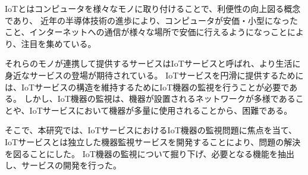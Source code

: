 IoTとはコンピュータを様々なモノに取り付けることで、利便性の向上図る概念であり、
近年の半導体技術の進歩により、コンピュータが安価・小型になったこと、インターネットへの通信が様々な場所で安価に行えるようになっことにより、注目を集めている。

それらのモノが連携して提供するサービスはIoTサービスと呼ばれ、より生活に身近なサービスの登場が期待されている。
IoTサービスを円滑に提供するためには、IoTサービスの構造を維持するためにIoT機器の監視を行うことが必要である。
しかし、IoT機器の監視は、機器が設置されるネットワークが多様であることや、IoTサービスにおいて機器が多量に使用されることから、困難である。


そこで、本研究では、IoTサービスにおけるIoT機器の監視問題に焦点を当て、IoTサービスとは独立した機器監視サービスを開発することにより、問題の解決を図ることにした。
IoT機器の監視について掘り下げ、必要となる機能を抽出し、サービスの開発を行った。



